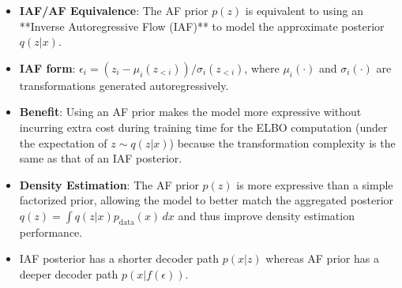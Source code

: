 \documentclass[12pt]{article}
\begin{document}
\begin{itemize}
\begin{itemize}
        \item \textbf{IAF/AF Equivalence}: The AF prior $p(z)$ is equivalent to using an **Inverse Autoregressive Flow (IAF)** to model the approximate posterior $q(z|x)$.
        \item \textbf{IAF form}: $\epsilon_i = (z_i - \mu_i(z_{<i})) / \sigma_i(z_{<i})$, where $\mu_i(\cdot)$ and $\sigma_i(\cdot)$ are transformations generated autoregressively.
        \item \textbf{Benefit}: Using an AF prior makes the model more expressive without incurring extra cost during training time for the ELBO computation (under the expectation of $z \sim q(z|x)$) because the transformation complexity is the same as that of an IAF posterior.
        \item \textbf{Density Estimation}: The AF prior $p(z)$ is more expressive than a simple factorized prior, allowing the model to better match the aggregated posterior $q(z) = \int q(z|x) p_{\text{data}}(x) \, dx$ and thus improve density estimation performance.
        \item IAF posterior has a shorter decoder path $p(x|z)$ whereas AF prior has a deeper decoder path $p(x|f(\epsilon))$.
    \end{itemize}
\end{itemize}

\end{document}
